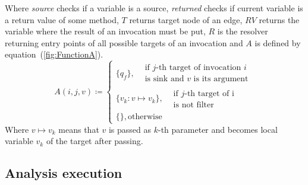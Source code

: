 Where \textit{source} checks if a variable is a source, \textit{returned} checks if current variable is a return value of some method, $T$ returns target node of an edge, $RV$ returns the variable where the result of an invocation must be put, $R$ is the resolver returning entry points of all possible targets of an invocation and $A$ is defined by equation~(\ref{fig:FunctionA}).
\begin{equation}
	\label{fig:FunctionA}
	A(i, j, v) \coloneqq 
	\begin{cases}
		\{q_f\},  \begin{split}&\textrm{if $j$-th target of invocation $i$} \\ & \textrm{is sink and $v$ is its argument}\end{split} \\
			\{v_k: v \mapsto v_k\}, \begin{split}&\textrm{if $j$-th target of i} \\ & \textrm{is not filter}\end{split} \\
		\{\}, \textrm{otherwise}
	\end{cases}
\end{equation}
Where $v \mapsto v_k$ means that $v$ is passed as $k$-th parameter and becomes local variable $v_k$ of the target after passing.

\subsection{Analysis execution}

